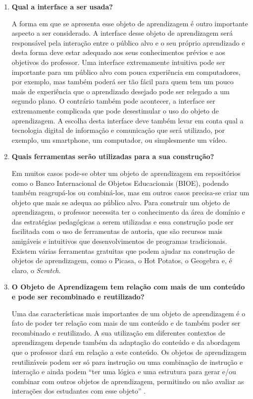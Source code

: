 \documentclass[12pt, openright, a4paper, brazil, english, french, spanish, bibjustif, openany, oneside]{abntex2}
\begin{document}
\begin{enumerate}[label=\textbf{\alph*)}]
\item \textbf{Qual a interface a ser usada?}

A forma em que se apresenta esse objeto de aprendizagem é outro importante aspecto a ser considerado. A interface desse objeto de aprendizagem será responsável pela interação entre o público alvo e o seu próprio aprendizado e desta forma deve estar adequado aos seus conhecimentos prévios e aos objetivos do professor. Uma interface extremamente intuitiva pode ser importante para um público alvo com pouca experiência em computadores, por exemplo, mas também poderá ser tão fácil para quem tem um pouco mais de experiência que o aprendizado desejado pode ser relegado a um segundo plano. O contrário também pode acontecer, a interface ser extremamente complicada que pode desestimular o uso do objeto de aprendizagem. A escolha desta interface deve também levar em conta qual a tecnologia digital de informação e comunicação que será utilizado, por exemplo, um smartphone, um computador, ou simplesmente um vídeo.

\item \textbf{Quais ferramentas serão utilizadas para a sua construção?}

Em muitos casos pode-se obter um objeto de aprendizagem em repositórios como o Banco Internacional de Objetos Educacionais (BIOE), podendo também reagrupá-los ou  combiná-los, mas em outros casos precisa-se criar um objeto que mais se adequa ao público alvo. Para construir um objeto de aprendizagem, o professor necessita ter o conhecimento da área de domínio e das estratégias pedagógicas a serem utilizadas e essa construção pode ser facilitada com o uso de ferramentas de autoria, que são recursos mais amigáveis e intuitivos que desenvolvimentos de programas tradicionais. Existem várias ferramentas gratuitas que podem ajudar na construção de objetos de aprendizagem, como o Picasa, o Hot Potatos, o Geogebra e, é claro, o \textit{Scratch}.

\item \textbf{O Objeto de Aprendizagem tem relação com mais de um conteúdo e pode ser recombinado e reutilizado?} 

Uma das características mais importantes de um objeto de aprendizagem é o fato de poder ter relação com mais de um conteúdo e de também poder ser recombinado e reutilizado. A sua utilização em diferentes contextos de aprendizagem depende também da adaptação do conteúdo e da abordagem que o professor dará em relação a este conteúdo. Os objetos de aprendizagem reutilizáveis podem ser só para instrução ou uma combinação de instrução e interação e ainda podem ``ter uma lógica e uma estrutura para gerar e/ou combinar com outros objetos de aprendizagem, permitindo ou não avaliar as interações dos estudantes com esse objeto'' \cite{tarouco}.

\end{enumerate}
\end{document}
